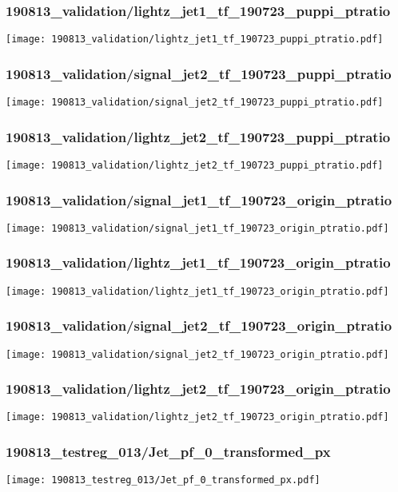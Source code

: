 \begin{frame}
   \frametitle{\small 190813\_validation/lightz\_jet1\_tf\_190723\_puppi\_ptratio}
   \centering
   \texttt{[image: 190813\_validation/lightz\_jet1\_tf\_190723\_puppi\_ptratio.pdf]}
\end{frame}

\begin{frame}
   \frametitle{\small 190813\_validation/signal\_jet2\_tf\_190723\_puppi\_ptratio}
   \centering
   \texttt{[image: 190813\_validation/signal\_jet2\_tf\_190723\_puppi\_ptratio.pdf]}
\end{frame}

\begin{frame}
   \frametitle{\small 190813\_validation/lightz\_jet2\_tf\_190723\_puppi\_ptratio}
   \centering
   \texttt{[image: 190813\_validation/lightz\_jet2\_tf\_190723\_puppi\_ptratio.pdf]}
\end{frame}

\begin{frame}
   \frametitle{\small 190813\_validation/signal\_jet1\_tf\_190723\_origin\_ptratio}
   \centering
   \texttt{[image: 190813\_validation/signal\_jet1\_tf\_190723\_origin\_ptratio.pdf]}
\end{frame}

\begin{frame}
   \frametitle{\small 190813\_validation/lightz\_jet1\_tf\_190723\_origin\_ptratio}
   \centering
   \texttt{[image: 190813\_validation/lightz\_jet1\_tf\_190723\_origin\_ptratio.pdf]}
\end{frame}

\begin{frame}
   \frametitle{\small 190813\_validation/signal\_jet2\_tf\_190723\_origin\_ptratio}
   \centering
   \texttt{[image: 190813\_validation/signal\_jet2\_tf\_190723\_origin\_ptratio.pdf]}
\end{frame}

\begin{frame}
   \frametitle{\small 190813\_validation/lightz\_jet2\_tf\_190723\_origin\_ptratio}
   \centering
   \texttt{[image: 190813\_validation/lightz\_jet2\_tf\_190723\_origin\_ptratio.pdf]}
\end{frame}

\begin{frame}
   \frametitle{\small 190813\_testreg\_013/Jet\_pf\_0\_transformed\_px}
   \centering
   \texttt{[image: 190813\_testreg\_013/Jet\_pf\_0\_transformed\_px.pdf]}
\end{frame}


